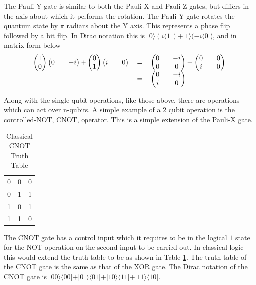 \documentclass[authoryearcitations]{UoYCSproject}
\begin{document}
The Pauli-Y gate is similar to both the Pauli-X and Pauli-Z gates, but differs in the axis about which it performs the rotation.
The Pauli-Y gate rotates the quantum state by $\pi$ radians about the Y axis.
This represents a phase flip followed by a bit flip.
In Dirac notation this is $\vert0\rangle
(i\langle1\vert) + \vert1\rangle(-i\langle0\vert$), and in matrix form below
\begin{equation}
\begin{tabular}{ r c l }
\(\begin {pmatrix}
1 \\
0
\end{pmatrix}
\begin {pmatrix}
0 &&
-i
\end{pmatrix}
 + 
\begin {pmatrix}
0 \\
1
\end{pmatrix}
\begin {pmatrix}
i &&
0
\end{pmatrix}\)
& \(=\)
& \( 
\begin{pmatrix}
0 && -i \\
0 && 0
\end{pmatrix}
 + 
\begin{pmatrix}
0 && 0\\
i && 0
\end{pmatrix}
\) \\
& \(=\)
& \( 
\begin{pmatrix}
0 && -i \\
i && 0
\end{pmatrix}
\)
\end{tabular}
\end{equation}

Along with the single qubit operations, like those above, there are operations which can act over n-qubits.
A simple example of a 2 qubit operation is the controlled-NOT, CNOT, operator.
This is a simple extension of the Pauli-X gate.
\begin{table}
\centering
\begin{tabular}{ l | c || r | }
0 & 0 & 0 \\
0 & 1 & 1 \\
1 & 0 & 1 \\
1 & 1 & 0 \\ \end{tabular}
\caption{Classical CNOT Truth Table}
\label{CNOTTruthTable}
\end{table}
The CNOT gate has a control input which it requires to be in the logical $1$ state for the NOT operation on the second input to be carried out.
In classical logic this would extend the truth table to be as shown in Table \ref{CNOTTruthTable}.
The truth table of the CNOT gate is the same as that of the XOR gate.
The Dirac notation of the CNOT gate is $\vert00\rangle\langle00\vert + \vert01\rangle\langle01\vert + \vert10\rangle\langle11\vert + \vert11\rangle\langle10\vert$.
\end{document}
